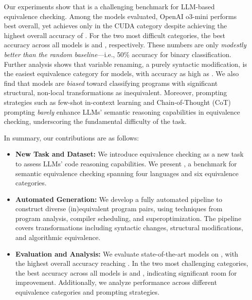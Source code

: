 Our experiments show that \name{} is a challenging benchmark for LLM-based equivalence checking. Among the \numllm models evaluated, OpenAI o3-mini performs best overall, yet achieves only \sotalowacc{} in the CUDA category despite achieving the highest overall accuracy of \sotaacc{}. For the two most difficult categories, the best accuracy across all models is \sotacuda{} and \sotadce{}, respectively.  These numbers are only \emph{modestly better than the random baseline}—i.e., 50\% accuracy for binary classification. Further analysis shows that variable renaming, a purely syntactic modification, is the easiest equivalence category for models, with accuracy as high as \sotaojv{}. We also find that models are \emph{biased} toward classifying programs with significant structural, non-local transformations as inequivalent. Moreover, prompting strategies such as few-shot in-context learning and Chain-of-Thought (CoT) prompting \emph{barely} enhance LLMs' semantic reasoning capabilities in equivalence checking, underscoring the fundamental difficulty of the task.

In summary, our contributions are as follows:


\begin{itemize}
    \item \textbf{New Task and Dataset:} We introduce equivalence checking as a new task to assess LLMs' code reasoning capabilities. We present \textit{\name{}}, a benchmark for semantic equivalence checking spanning four languages and six equivalence categories.
    
    \item \textbf{Automated Generation:} We develop a fully automated pipeline to construct diverse (in)equivalent program pairs, using techniques from program analysis, compiler scheduling, and superoptimization. The pipeline covers transformations including syntactic changes, structural modifications, and algorithmic equivalence.

    \item \textbf{Evaluation and Analysis:} We evaluate \numllm state-of-the-art models on \name, with the highest overall accuracy reaching \sotaacc{}. In the two most challenging categories, the best accuracy across all models is \sotacuda{} and \sotadce{}, indicating significant room for improvement. Additionally, we analyze performance across different equivalence categories and prompting strategies.
\end{itemize}

